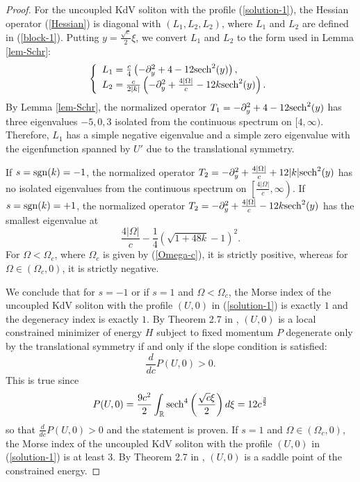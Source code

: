 \documentclass[12pt,reqno]{amsart}
\numberwithin{equation}{section}
\begin{document}
\begin{proof} 
For the uncoupled KdV soliton with the profile (\ref{solution-1}), the Hessian operator (\ref{Hessian}) is diagonal with 
$(L_1,L_2,L_2)$, where $L_1$ and $L_2$ are defined in (\ref{block-1}). Putting \(y = \frac{\sqrt{c}}{2} \xi\), 
we convert $L_1$ and $L_2$ to the form used in Lemma \ref{lem-Schr}:
\begin{align}
\label{block-2}
\left\{ \begin{array}{l}
    L_1 = \frac{c}{4} \left( - \partial_y^2 + 4 - 12 {\rm sech}^2(y) \right), \\
    L_2 = \frac{c}{2 |k|} \left( - \partial_y^2 + \frac{4 |\Omega|}{c} - 12 k {\rm sech}^2(y) \right).
    \end{array} \right.
\end{align}
By Lemma \ref{lem-Schr}, the normalized operator $T_1 = - \partial_y^2 + 4 - 12 {\rm sech}^2(y)$
has three eigenvalues \(-5,0,3\) isolated from the continuous spectrum on $[4,\infty)$. 
Therefore, $L_1$ has a simple negative eigenvalue and a simple 
zero eigenvalue with the eigenfunction spanned by $U'$ due to the translational symmetry.

If $s = {\rm sgn}(k) = -1$, the normalized operator $T_2 = - \partial_y^2 + \frac{4 |\Omega|}{c} + 12 |k| {\rm sech}^2(y)$
has no isolated eigenvalues from the continuous spectrum on $\left[ \frac{4 |\Omega|}{c},\infty \right)$. 
If $s = {\rm sgn}(k) = +1$, the normalized operator $T_2 = - \partial_y^2 + \frac{4 |\Omega|}{c} - 12 k {\rm sech}^2(y)$
has the smallest eigenvalue at 
$$
\frac{4 |\Omega|}{c} - \frac{1}{4} \left( \sqrt{1 + 48 k} - 1 \right)^2. 
$$
For $\Omega < \Omega_c$, where $\Omega_c$ is given by (\ref{Omega-c}), it is strictly positive, 
whereas for $\Omega \in (\Omega_c,0)$, it is strictly negative. 

We conclude that for $s = -1$ or if $s = 1$ and $\Omega < \Omega_c$, 
the Morse index of the uncoupled KdV soliton with the profile $(U,0)$ in (\ref{solution-1}) is exactly $1$ and the degeneracy index 
is exactly $1$. By Theorem 2.7 in \cite{Dmitry}, $(U,0)$ is a local constrained minimizer of energy $H$ 
subject to fixed momentum $P$ degenerate only by the translational symmetry 
if and only if the slope condition is satisfied:
$$
\frac{d}{dc} P(U,0) > 0.
$$
This is true since 
\begin{equation}
    \label{momentum-zero}
P(U,0) = \frac{9c^2}{2} \int_{\mathbb{R}} {\rm sech}^4\left(\frac{\sqrt{c} \xi}{2}\right) d\xi = 12 c^{\frac{3}{2}}
\end{equation}
so that $\frac{d}{dc} P(U,0) > 0$ and the statement is proven.
If $s = 1$ and $\Omega \in (\Omega_c,0)$, the Morse index of the uncoupled KdV soliton with the profile $(U,0)$ in (\ref{solution-1}) is at least $3$. By Theorem 2.7 in \cite{Dmitry}, $(U,0)$ is a saddle point of the constrained energy. 
\end{proof}
\end{document}
